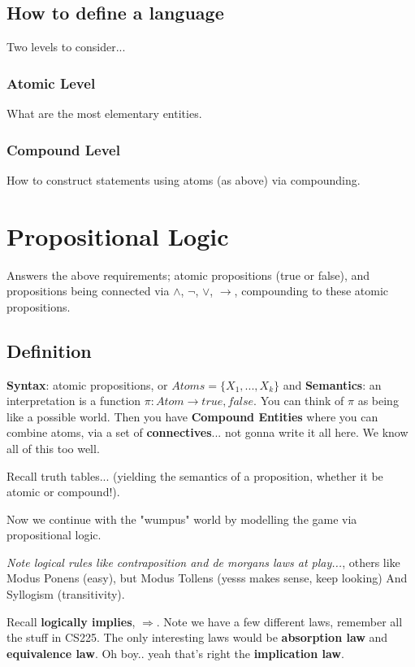 \documentclass{article}
\begin{document}
\subsection{How to define a language}
Two levels to consider...

\subsubsection{Atomic Level}
What are the most elementary entities.

\subsubsection{Compound Level}
How to construct statements using atoms (as above) via compounding.

\section{Propositional Logic}
Answers the above requirements; atomic propositions (true or false), and propositions being connected via $\land$, $\neg$, $\lor$, $\rightarrow$, compounding to these atomic propositions.

\subsection{Definition}
\textbf{Syntax}: atomic propositions, or $Atoms = \{X_1, ..., X_k\}$ and \textbf{Semantics}: an interpretation is a function $\pi: Atom \rightarrow {true, false}$. You can think of $\pi$ as being like a possible world. Then you have \textbf{Compound Entities} where you can combine atoms, via a set of \textbf{connectives}... not gonna write it all here. We know all of this too well.

Recall truth tables... (yielding the semantics of a proposition, whether it be atomic or compound!).

Now we continue with the "wumpus" world by modelling the game via propositional logic.

\emph{Note logical rules like contraposition and de morgans laws at play...}, others like Modus Ponens (easy), but Modus Tollens (yesss makes sense, keep looking) And Syllogism (transitivity).

Recall \textbf{logically implies}, $\Rightarrow$. Note we have a few different laws, remember all the stuff in CS225. The only interesting laws would be \textbf{absorption law} and \textbf{equivalence law}. Oh boy.. yeah that's right the \textbf{implication law}.
\end{document}
